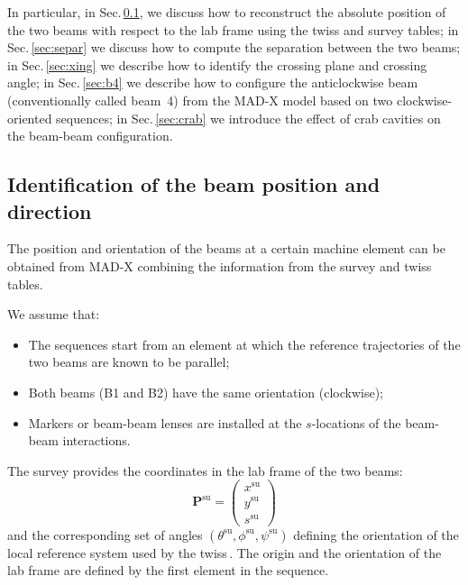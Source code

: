 In particular, in Sec.\,\ref{sec:posdir}, we discuss how to reconstruct the absolute position of the two beams with respect to the lab frame using the twiss and survey tables; in Sec.\,\ref{sec:separ} we discuss how to compute the separation between the two beams; in Sec.\,\ref{sec:xing} we describe how to identify the crossing plane and crossing angle; in Sec.\,\ref{sec:b4} we describe how to configure the anticlockwise beam (conventionally called beam~4)  from the MAD-X model based on two clockwise-oriented sequences; in Sec.\,\ref{sec:crab} we introduce the effect of crab cavities on the beam-beam configuration. 

\subsection{Identification of the beam position and direction}
\label{sec:posdir}

The position and orientation of the beams at a certain machine element can be obtained from MAD-X combining the information from the survey and twiss tables.

We assume that:
\begin{itemize}
    \item The sequences start from an element at which the reference trajectories of the two beams are known to be parallel;
    \item Both beams (B1 and B2) have the same orientation (clockwise);
    \item Markers or beam-beam lenses are installed at the $s$-locations of the beam-beam interactions.
\end{itemize}

The survey provides the coordinates in the lab frame of the two beams:
\begin{equation}
    \textbf{P}^\text{su} = \left(
    \begin{array}{c}
         x^\text{su}\\
         y^\text{su}\\
         s^\text{su}
    \end{array}\right)
\end{equation}
and the corresponding set of angles $(\theta^\text{su}, \phi^\text{su}, \psi^\text{su})$ defining the orientation of the local reference system used by the twiss\,\cite{madsite}. The origin and the orientation of the lab frame are defined by the first element in the sequence.

